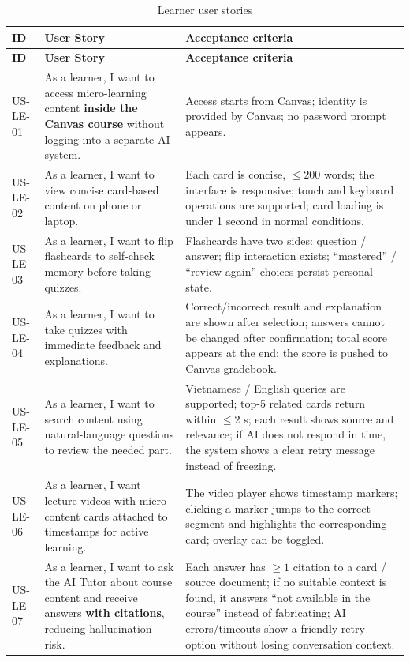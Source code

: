 \begingroup
\scriptsize
\setlength{\tabcolsep}{3pt}
\begin{longtable}{|p{1.6cm}|p{5.6cm}|p{7cm}|}
\caption{Learner user stories}
\label{tab:user-stories-hoc-vien}\\
\hline
\textbf{ID} & \textbf{User Story} & \textbf{Acceptance criteria} \\
\hline
\endfirsthead
\hline
\textbf{ID} & \textbf{User Story} & \textbf{Acceptance criteria} \\
\hline
\endhead
US-LE-01 & As a learner, I want to access micro-learning content \textbf{inside the Canvas course} without logging into a separate AI system. & Access starts from Canvas; identity is provided by Canvas; no password prompt appears. \\
\hline
US-LE-02 & As a learner, I want to view concise card-based content on phone or laptop. & Each card is concise, \(\leq 200\) words; the interface is responsive; touch and keyboard operations are supported; card loading is under 1 second in normal conditions. \\
\hline
US-LE-03 & As a learner, I want to flip flashcards to self-check memory before taking quizzes. & Flashcards have two sides: question / answer; flip interaction exists; ``mastered'' / ``review again'' choices persist personal state. \\
\hline
US-LE-04 & As a learner, I want to take quizzes with immediate feedback and explanations. & Correct/incorrect result and explanation are shown after selection; answers cannot be changed after confirmation; total score appears at the end; the score is pushed to Canvas gradebook. \\
\hline
US-LE-05 & As a learner, I want to search content using natural-language questions to review the needed part. & Vietnamese / English queries are supported; top-5 related cards return within \(\leq 2\) s; each result shows source and relevance; if AI does not respond in time, the system shows a clear retry message instead of freezing. \\
\hline
US-LE-06 & As a learner, I want lecture videos with micro-content cards attached to timestamps for active learning. & The video player shows timestamp markers; clicking a marker jumps to the correct segment and highlights the corresponding card; overlay can be toggled. \\
\hline
US-LE-07 & As a learner, I want to ask the AI Tutor about course content and receive answers \textbf{with citations}, reducing hallucination risk. & Each answer has \(\geq 1\) citation to a card / source document; if no suitable context is found, it answers ``not available in the course'' instead of fabricating; AI errors/timeouts show a friendly retry option without losing conversation context. \\

\end{longtable}
